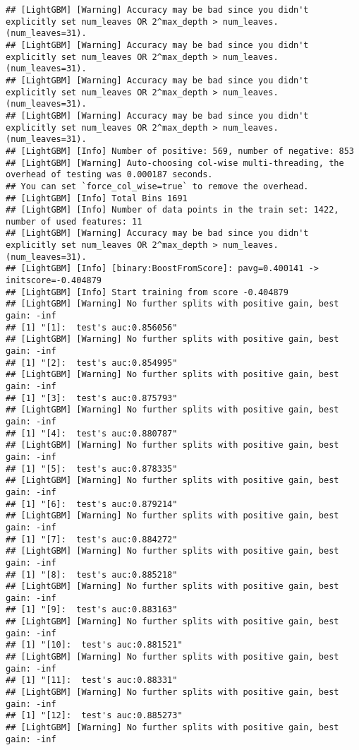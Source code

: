 \documentclass[
]{article}
\begin{document}
\begin{verbatim}
## [LightGBM] [Warning] Accuracy may be bad since you didn't explicitly set num_leaves OR 2^max_depth > num_leaves. (num_leaves=31).
## [LightGBM] [Warning] Accuracy may be bad since you didn't explicitly set num_leaves OR 2^max_depth > num_leaves. (num_leaves=31).
## [LightGBM] [Warning] Accuracy may be bad since you didn't explicitly set num_leaves OR 2^max_depth > num_leaves. (num_leaves=31).
## [LightGBM] [Warning] Accuracy may be bad since you didn't explicitly set num_leaves OR 2^max_depth > num_leaves. (num_leaves=31).
## [LightGBM] [Info] Number of positive: 569, number of negative: 853
## [LightGBM] [Warning] Auto-choosing col-wise multi-threading, the overhead of testing was 0.000187 seconds.
## You can set `force_col_wise=true` to remove the overhead.
## [LightGBM] [Info] Total Bins 1691
## [LightGBM] [Info] Number of data points in the train set: 1422, number of used features: 11
## [LightGBM] [Warning] Accuracy may be bad since you didn't explicitly set num_leaves OR 2^max_depth > num_leaves. (num_leaves=31).
## [LightGBM] [Info] [binary:BoostFromScore]: pavg=0.400141 -> initscore=-0.404879
## [LightGBM] [Info] Start training from score -0.404879
## [LightGBM] [Warning] No further splits with positive gain, best gain: -inf
## [1] "[1]:  test's auc:0.856056"
## [LightGBM] [Warning] No further splits with positive gain, best gain: -inf
## [1] "[2]:  test's auc:0.854995"
## [LightGBM] [Warning] No further splits with positive gain, best gain: -inf
## [1] "[3]:  test's auc:0.875793"
## [LightGBM] [Warning] No further splits with positive gain, best gain: -inf
## [1] "[4]:  test's auc:0.880787"
## [LightGBM] [Warning] No further splits with positive gain, best gain: -inf
## [1] "[5]:  test's auc:0.878335"
## [LightGBM] [Warning] No further splits with positive gain, best gain: -inf
## [1] "[6]:  test's auc:0.879214"
## [LightGBM] [Warning] No further splits with positive gain, best gain: -inf
## [1] "[7]:  test's auc:0.884272"
## [LightGBM] [Warning] No further splits with positive gain, best gain: -inf
## [1] "[8]:  test's auc:0.885218"
## [LightGBM] [Warning] No further splits with positive gain, best gain: -inf
## [1] "[9]:  test's auc:0.883163"
## [LightGBM] [Warning] No further splits with positive gain, best gain: -inf
## [1] "[10]:  test's auc:0.881521"
## [LightGBM] [Warning] No further splits with positive gain, best gain: -inf
## [1] "[11]:  test's auc:0.88331"
## [LightGBM] [Warning] No further splits with positive gain, best gain: -inf
## [1] "[12]:  test's auc:0.885273"
## [LightGBM] [Warning] No further splits with positive gain, best gain: -inf

\end{verbatim}
\end{document}
